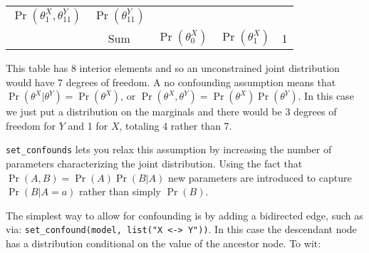 \documentclass[
  12pt,
]{book}
\newenvironment{Shaded}{\begin{snugshade}}{\end{snugshade}}
\newcommand{\KeywordTok}[1]{\textcolor[rgb]{0.13,0.29,0.53}{\textbf{#1}}}
\newcommand{\NormalTok}[1]{#1}
\newcommand{\OperatorTok}[1]{\textcolor[rgb]{0.81,0.36,0.00}{\textbf{#1}}}
\newcommand{\StringTok}[1]{\textcolor[rgb]{0.31,0.60,0.02}{#1}}
\begin{document}
\begin{longtable}[]{@{}cccll@{}}
\begin{minipage}[t]{0.30\columnwidth}
\(\Pr(\theta^X_1, \theta^Y_{11})\)\strut
\end{minipage} & \begin{minipage}[t]{0.16\columnwidth}\raggedright
\(\Pr(\theta^Y_{11})\)\strut
\end{minipage}\tabularnewline
\begin{minipage}[t]{0.04\columnwidth}\centering
\strut
\end{minipage} & \begin{minipage}[t]{0.06\columnwidth}\centering
Sum\strut
\end{minipage} & \begin{minipage}[t]{0.30\columnwidth}\centering
\(\Pr(\theta^X_0)\)\strut
\end{minipage} & \begin{minipage}[t]{0.30\columnwidth}\raggedright
\(\Pr(\theta^X_1)\)\strut
\end{minipage} & \begin{minipage}[t]{0.16\columnwidth}\raggedright
1\strut
\end{minipage}\tabularnewline
\bottomrule
\end{longtable}

This table has 8 interior elements and so an unconstrained joint distribution would have 7 degrees of freedom. A no confounding assumption means that \(\Pr(\theta^X | \theta^Y) = \Pr(\theta^X)\), or \(\Pr(\theta^X, \theta^Y) = \Pr(\theta^X)\Pr(\theta^Y)\). In this case we just put a distribution on the marginals and there would be 3 degrees of freedom for \(Y\) and 1 for \(X\), totaling \(4\) rather than 7.

\texttt{set\_confounds} lets you relax this assumption by increasing the number of parameters characterizing the joint distribution. Using the fact that \(\Pr(A,B) = \Pr(A)\Pr(B|A)\) new parameters are introduced to capture \(\Pr(B|A=a)\) rather than simply \(\Pr(B)\).

The simplest way to allow for confounding is by adding a bidirected edge, such as via: \texttt{set\_confound(model,\ list("X\ \textless{}-\textgreater{}\ Y"))}. In this case the descendant node has a distribution conditional on the value of the ancestor node. To wit:

\begin{Shaded}
\end{Shaded}
\end{document}
